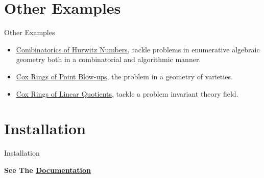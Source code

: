 \documentclass[aspectratio=169,xcolor=dvipsnames]{beamer}
\begin{document}


\section{Other Examples}


\begin{frame}{Other Examples}
    \begin{itemize}
        \item \textcolor{brown}{\href{https://github.com/micjoswig/oscar-notebooks/blob/master/SIAM-News/Hurwitz_Combinatorics.ipynb}{Combinatorics of Hurwitz Numbers}}, tackle problems in enumerative algebraic geometry both in a combinatorial and algorithmic manner.
        \item \textcolor{brown}{\href{https://github.com/micjoswig/oscar-notebooks/blob/master/SIAM-News/Cox_rings_of_blow_ups_of_points.ipynb}{Cox Rings of Point Blow-ups}}, the problem in a geometry of varieties.
        \item \textcolor{brown}{\href{https://github.com/micjoswig/oscar-notebooks/blob/master/SIAM-News/Cox_rings_of_linear_quotients.ipynb}{Cox Rings of Linear Quotients}}, tackle a problem invariant theory field. 
        
    \end{itemize}
\end{frame}


\section{Installation}

\begin{frame}{Installation}
    \Huge{\centerline{\textbf{See The \href{https://www.oscar-system.org/}{Documentation}}}}
\end{frame}
\end{document}
